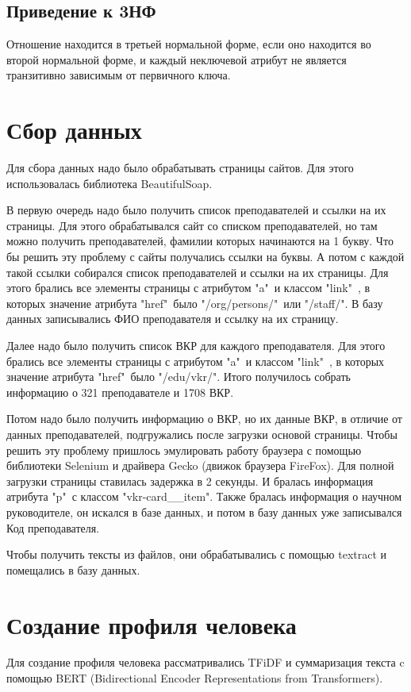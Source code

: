 \documentclass[PI,KR]{HSEUniversity}
\begin{document}
\subsection{Приведение к 3НФ}
Отношение находится в третьей нормальной форме, если оно находится во второй нормальной форме, и каждый неключевой атрибут не является транзитивно зависимым от первичного ключа.
\section{Сбор данных}
Для сбора данных надо было обрабатывать страницы сайтов. Для этого использовалась библиотека BeautifulSoap.

В первую очередь надо было получить список преподавателей и ссылки на их страницы. Для этого обрабатывался сайт со списком преподавателей, но там можно получить преподавателей, фамилии которых начинаются на 1 букву. Что бы решить эту проблему с сайты получались ссылки на буквы. А потом с каждой такой ссылки собирался список преподавателей и ссылки на их страницы. Для этого брались все элементы страницы с атрибутом "a"\ и классом "link"\ , в которых значение атрибута "href"\ было "/org/persons/"\ или "/staff/". В базу данных записывались ФИО преподавателя и ссылку на их страницу. 

Далее надо было получить список ВКР для каждого преподавателя. Для этого брались все элементы страницы с атрибутом "a"\ и классом "link"\ , в которых значение атрибута "href"\ было "/edu/vkr/". Итого получилось собрать информацию о 321 преподавателе и 1708 ВКР.

Потом надо было получить информацию о ВКР, но их данные ВКР, в отличие от данных преподавателей, подгружались после загрузки основой страницы. Чтобы решить эту проблему пришлось эмулировать работу браузера с помощью библиотеки Selenium и драйвера Gecko (движок браузера FireFox). Для полной загрузки страницы ставилась задержка в 2 секунды. И бралась информация атрибута "p"\ с классом "vkr-card\_\_item". Также бралась информация о научном руководителе, он искался в базе данных, и потом в базу данных уже записывался Код преподавателя.

Чтобы получить тексты из файлов, они обрабатывались с помощью textract и помещались в базу данных.
\section{Создание профиля человека}
Для создание профиля человека рассматривались TFiDF и суммаризация текста c помощью BERT\cite{devlin2019bert} (Bidirectional Encoder Representations from Transformers). 
\end{document}
